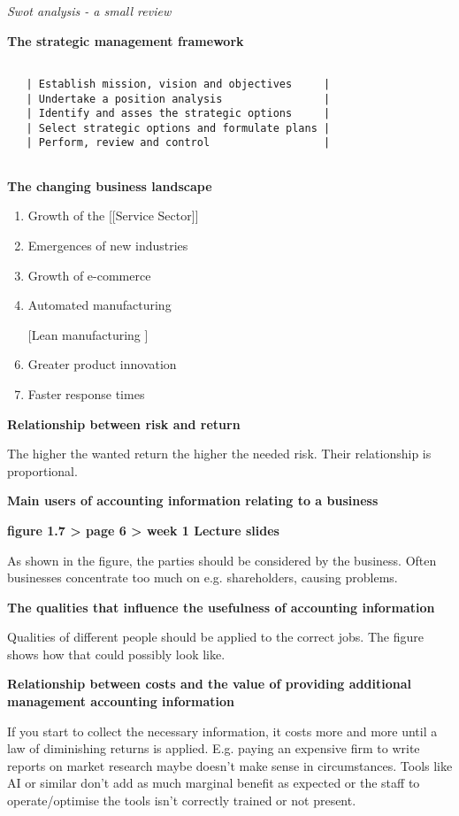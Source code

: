 \documentclass{article}
\begin{document}
\textit{Swot analysis - a small review}

\textbf{The strategic management framework}

\begin{verbatim} 

   | Establish mission, vision and objectives     |
   | Undertake a position analysis                |
   | Identify and asses the strategic options     |
   | Select strategic options and formulate plans |
   | Perform, review and control                  |
    
\end{verbatim}

\textbf{The changing business landscape}

    \begin{enumerate}
      \item Growth of the [[Service Sector]]
      \item Emergences of new industries
      \item Growth of e-commerce
      \item Automated manufacturing
      \item [[Lean manufacturing]]
      \item Greater product innovation
      \item Faster response times
    \end{enumerate}

\textbf{Relationship between risk and return}


The higher the wanted return the higher the needed risk. Their relationship is proportional.

\textbf{Main users of accounting information relating to a business}


\textbf{figure 1.7 > page 6 > week 1 Lecture slides}

As shown in the figure, the parties should be considered by the business. Often businesses concentrate too much on e.g. shareholders, causing problems.

\textbf{The qualities that influence the usefulness of accounting information}


Qualities of different people should be applied to the correct jobs. The figure shows how that could possibly look like.

\textbf{Relationship between costs and the value of providing additional management accounting information}


If you start to collect the necessary information, it costs more and more until a law of diminishing returns is applied. 
E.g. paying an expensive firm to write reports on market research maybe doesn't make sense in circumstances. Tools like AI or similar don't add as much marginal benefit as expected or the staff to operate/optimise the tools isn't correctly trained or not present.
\end{document}
